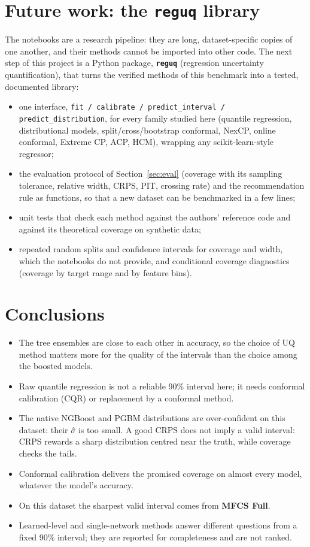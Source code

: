 \documentclass[11pt]{article}
\begin{document}
\section{Future work: the \texttt{reguq} library}\label{sec:future}
The notebooks are a research pipeline: they are long, dataset-specific copies of one another, and their methods cannot be imported
into other code. The next step of this project is a Python package, \textbf{\texttt{reguq}} (regression uncertainty quantification),
that turns the verified methods of this benchmark into a tested, documented library:
\begin{itemize}
\item one interface, \texttt{fit / calibrate / predict\_interval / predict\_distribution}, for every family studied here (quantile
regression, distributional models, split/cross/bootstrap conformal, NexCP, online conformal, Extreme CP, ACP, HCM), wrapping any
scikit-learn-style regressor;
\item the evaluation protocol of Section~\ref{sec:eval} (coverage with its sampling tolerance, relative width, CRPS, PIT, crossing
rate) and the recommendation rule as functions, so that a new dataset can be benchmarked in a few lines;
\item unit tests that check each method against the authors' reference code and against its theoretical coverage on synthetic data;
\item repeated random splits and confidence intervals for coverage and width, which the notebooks do not provide, and conditional
coverage diagnostics (coverage by target range and by feature bins).
\end{itemize}

\section{Conclusions}
\begin{itemize}
\item The tree ensembles are close to each other in accuracy, so the choice of UQ method matters more for the quality of the intervals than the choice among the boosted models.
\item Raw quantile regression is not a reliable 90\% interval here; it needs conformal calibration (CQR) or replacement by a conformal method.
\item The native NGBoost and PGBM distributions are over-confident on this dataset: their $\sigma$̂ is too small. A good CRPS does not imply a valid interval: CRPS rewards a sharp distribution centred near the truth, while coverage checks the tails.
\item Conformal calibration delivers the promised coverage on almost every model, whatever the model's accuracy.
\item On this dataset the sharpest valid interval comes from \textbf{MFCS Full}.
\item Learned-level and single-network methods answer different questions from a fixed 90\% interval; they are reported for completeness and are not ranked.
\end{itemize}
\end{document}
